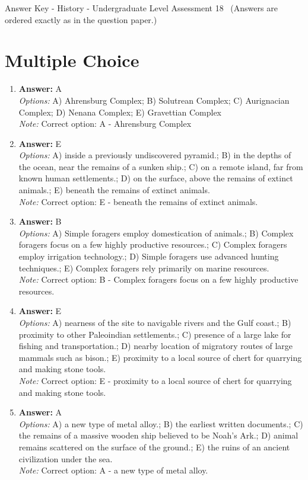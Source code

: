 \documentclass[12pt]{article}
\begin{document}
\begin{center}
Answer Key - History - Undergraduate Level Assessment 18 \
\small (Answers are ordered exactly as in the question paper.)
\end{center}

\section*{Multiple Choice}
\begin{enumerate}[label=\arabic*.]
\item \textbf{Answer:} A
\\ \textit{Options:} A) Ahrensburg Complex; B) Solutrean Complex; C) Aurignacian Complex; D) Nenana Complex; E) Gravettian Complex
\\ \textit{Note:} Correct option: A - Ahrensburg Complex
\item \textbf{Answer:} E
\\ \textit{Options:} A) inside a previously undiscovered pyramid.; B) in the depths of the ocean, near the remains of a sunken ship.; C) on a remote island, far from known human settlements.; D) on the surface, above the remains of extinct animals.; E) beneath the remains of extinct animals.
\\ \textit{Note:} Correct option: E - beneath the remains of extinct animals.
\item \textbf{Answer:} B
\\ \textit{Options:} A) Simple foragers employ domestication of animals.; B) Complex foragers focus on a few highly productive resources.; C) Complex foragers employ irrigation technology.; D) Simple foragers use advanced hunting techniques.; E) Complex foragers rely primarily on marine resources.
\\ \textit{Note:} Correct option: B - Complex foragers focus on a few highly productive resources.
\item \textbf{Answer:} E
\\ \textit{Options:} A) nearness of the site to navigable rivers and the Gulf coast.; B) proximity to other Paleoindian settlements.; C) presence of a large lake for fishing and transportation.; D) nearby location of migratory routes of large mammals such as bison.; E) proximity to a local source of chert for quarrying and making stone tools.
\\ \textit{Note:} Correct option: E - proximity to a local source of chert for quarrying and making stone tools.
\item \textbf{Answer:} A
\\ \textit{Options:} A) a new type of metal alloy.; B) the earliest written documents.; C) the remains of a massive wooden ship believed to be Noah's Ark.; D) animal remains scattered on the surface of the ground.; E) the ruins of an ancient civilization under the sea.
\\ \textit{Note:} Correct option: A - a new type of metal alloy.
\end{enumerate}
\end{document}
